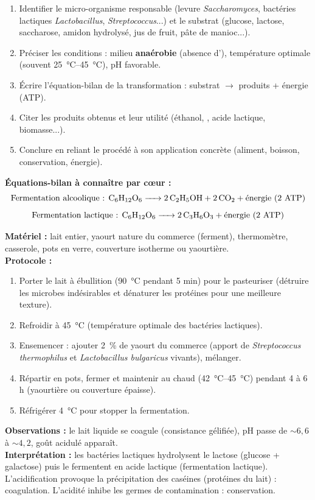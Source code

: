 \documentclass[11pt]{article}
\newcommand{\cle}[1]{{\popxbold\color{popdark}#1}}
\begin{document}
\begin{methode}
\begin{enumerate}
\item \cle{Identifier le micro-organisme} responsable (levure \emph{Saccharomyces}, bactéries lactiques \emph{Lactobacillus}, \emph{Streptococcus}...) et le \cle{substrat} (glucose, lactose, saccharose, amidon hydrolysé, jus de fruit, pâte de manioc...).
\item \cle{Préciser les conditions} : milieu \textbf{anaérobie} (absence d'), température optimale (souvent \SIrange{25}{45}{\celsius}), pH favorable.
\item \cle{Écrire l'équation-bilan} de la transformation : substrat $\rightarrow$ produits + énergie (ATP).
\item \cle{Citer les produits obtenus} et leur utilité (éthanol, , acide lactique, biomasse...).
\item \cle{Conclure} en reliant le procédé à son application concrète (aliment, boisson, conservation, énergie).
\end{enumerate}
\textbf{Équations-bilan à connaître par cœur :}
\[ \text{Fermentation alcoolique : } \ce{C6H12O6 -> 2 C2H5OH + 2 CO2} + \text{énergie (2 ATP)} \]
\[ \text{Fermentation lactique : } \ce{C6H12O6 -> 2 C3H6O3} + \text{énergie (2 ATP)} \]
\end{methode}

\begin{experience}
\textbf{Matériel :} lait entier, yaourt nature du commerce (ferment), thermomètre, casserole, pots en verre, couverture isotherme ou yaourtière.\\
\textbf{Protocole :}
\begin{enumerate}
\item Porter le lait à ébullition (\SI{90}{\celsius} pendant 5 min) pour le pasteuriser (détruire les microbes indésirables et dénaturer les protéines pour une meilleure texture).
\item Refroidir à \SI{45}{\celsius} (température optimale des bactéries lactiques).
\item Ensemencer : ajouter \SI{2}{\%} de yaourt du commerce (apport de \emph{Streptococcus thermophilus} et \emph{Lactobacillus bulgaricus} vivants), mélanger.
\item Répartir en pots, fermer et maintenir au chaud (\SI{42}{\celsius}--\SI{45}{\celsius}) pendant 4 à 6 h (yaourtière ou couverture épaisse).
\item Réfrigérer \SI{4}{\celsius} pour stopper la fermentation.
\end{enumerate}
\textbf{Observations :} le lait liquide se coagule (consistance gélifiée), pH passe de $\sim 6,6$ à $\sim 4,2$, goût acidulé apparaît.\\
\textbf{Interprétation :} les bactéries lactiques hydrolysent le lactose (glucose + galactose) puis le fermentent en acide lactique (fermentation lactique). L'acidification provoque la précipitation des caséines (protéines du lait) : coagulation. L'acidité inhibe les germes de contamination : conservation.
\end{experience}
\end{document}
